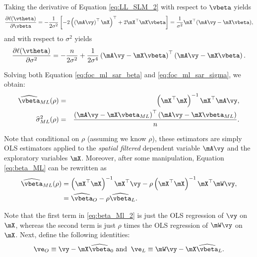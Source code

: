 \documentclass[english,12pt]{book}\usepackage[]{graphicx}\usepackage[]{xcolor}
\begin{document}
Taking the derivative of Equation \eqref{eq:LL_SLM_2} with respect to $\vbeta$ yields
\begin{equation}\label{eq:foc_ml_sar_beta}
\frac{\partial \ell(\vtheta)}{\partial \vbeta} = -\frac{1}{2\sigma^2}\left[-2\left(\left(\mA\vy\right)^\top\mX\right)^\top + 2 \mX^\top\mX\vbeta\right] = \frac{1}{\sigma^2}\mX^\top(\mA\vy - \mX\vbeta),
\end{equation}
%
and with respect to $\sigma^2$ yields
\begin{equation}\label{eq:foc_ml_sar_sigma}
\frac{\partial \ell(\vtheta)}{\partial \sigma^2} = -\frac{n}{2\sigma^2} + \frac{1}{2\sigma^4}\left(\mA\vy - \mX\vbeta\right)^\top\left(\mA\vy - \mX\vbeta\right).
\end{equation}

Solving both Equation \eqref{eq:foc_ml_sar_beta} and \eqref{eq:foc_ml_sar_sigma}, we obtain:
\begin{eqnarray}
	\widehat{\vbeta}_{ML}(\rho) &=& \left(\mX^\top\mX\right)^{-1}\mX^\top\mA\vy \label{eq:beta_ML}, \\
	\widehat{\sigma}^2_{ML}(\rho) &=& \frac{\left(\mA\vy - \mX\vbeta_{ML}\right)^\top\left(\mA\vy - \mX\vbeta_{ML}\right)}{n}\label{eq:sigma_ML}.
\end{eqnarray}

Note that conditional on $\rho$ (assuming we know $\rho$), these estimators are simply OLS estimators applied to the \emph{spatial filtered} dependent variable $\mA\vy$ and the exploratory variables $\mX$. Moreover, after some manipulation, Equation \eqref{eq:beta_ML} can be rewritten as
\begin{equation}\label{eq:beta_Ml_2}
\begin{aligned}
\widehat{\vbeta}_{ML}(\rho) &= \left(\mX^\top\mX\right)^{-1}\mX^\top\vy - \rho\left(\mX^\top\mX\right)^{-1}\mX^\top\mW\vy, \\
&= \widehat{\vbeta}_O -\rho \widehat{\vbeta}_L.
\end{aligned}
\end{equation}

Note that the first term in \eqref{eq:beta_Ml_2} is just the OLS regression of $\vy$ on $\mX$, whereas the second term is just $\rho$ times the OLS regression of $\mW\vy$ on $\mX$. Next, define the following identities:
\begin{equation}\label{eq:SLM_aux_residuals}
\ve_O \equiv \vy - \mX\widehat{\vbeta}_0\,\,\mbox{and} \;\; \ve_L \equiv \mW\vy - \mX\widehat{\vbeta}_L.
\end{equation}
\end{document}
